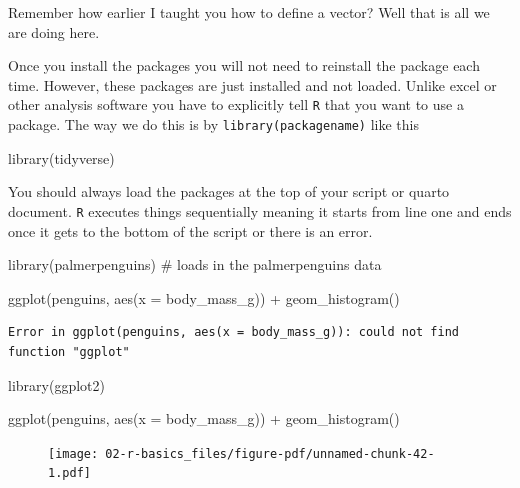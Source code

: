 \documentclass[
  letterpaper,
  DIV=11,
  numbers=noendperiod,
  oneside]{scrreprt}
\newenvironment{Shaded}{\begin{snugshade}}{\end{snugshade}}
\newcommand{\AttributeTok}[1]{\textcolor[rgb]{0.40,0.45,0.13}{#1}}
\newcommand{\CommentTok}[1]{\textcolor[rgb]{0.37,0.37,0.37}{#1}}
\newcommand{\FunctionTok}[1]{\textcolor[rgb]{0.28,0.35,0.67}{#1}}
\newcommand{\NormalTok}[1]{\textcolor[rgb]{0.00,0.23,0.31}{#1}}
\newcommand{\SpecialCharTok}[1]{\textcolor[rgb]{0.37,0.37,0.37}{#1}}
\begin{document}
Remember how earlier I taught you how to define a vector? Well that is
all we are doing here.

Once you install the packages you will not need to reinstall the package
each time. However, these packages are just installed and not loaded.
Unlike excel or other analysis software you have to explicitly tell
\texttt{R} that you want to use a package. The way we do this is by
\texttt{library(packagename)} like this

\begin{Shaded}
\begin{Highlighting}[]
\FunctionTok{library}\NormalTok{(tidyverse)}
\end{Highlighting}
\end{Shaded}

You should always load the packages at the top of your script or quarto
document. \texttt{R} executes things sequentially meaning it starts from
line one and ends once it gets to the bottom of the script or there is
an error.

\begin{Shaded}
\begin{Highlighting}[]
\FunctionTok{library}\NormalTok{(palmerpenguins) }\CommentTok{\# loads in the palmerpenguins data}


\FunctionTok{ggplot}\NormalTok{(penguins, }\FunctionTok{aes}\NormalTok{(}\AttributeTok{x =}\NormalTok{ body\_mass\_g)) }\SpecialCharTok{+}
\FunctionTok{geom\_histogram}\NormalTok{()}
\end{Highlighting}
\end{Shaded}

\begin{verbatim}
Error in ggplot(penguins, aes(x = body_mass_g)): could not find function "ggplot"
\end{verbatim}

\begin{Shaded}
\begin{Highlighting}[]
\FunctionTok{library}\NormalTok{(ggplot2)}

\FunctionTok{ggplot}\NormalTok{(penguins, }\FunctionTok{aes}\NormalTok{(}\AttributeTok{x =}\NormalTok{ body\_mass\_g)) }\SpecialCharTok{+}
\FunctionTok{geom\_histogram}\NormalTok{()}
\end{Highlighting}
\end{Shaded}

\begin{figure}[H]

{\centering \texttt{[image: 02-r-basics\_files/figure-pdf/unnamed-chunk-42-1.pdf]}

}

\end{figure}
\end{document}
